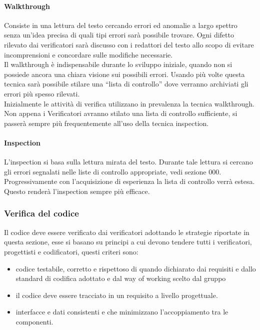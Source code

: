 			\paragraph{Walkthrough}
				Consiste in una lettura del testo cercando errori ed anomalie a largo spettro senza un’idea precisa di quali tipi errori sarà possibile trovare. Ogni difetto rilevato dai verificatori sarà discusso con i redattori del testo allo scopo di evitare incomprensioni e concordare sulle modifiche necessarie.\\
				Il walkthrough è indispensabile durante lo sviluppo iniziale, quando non si possiede ancora una chiara visione sui possibili errori. Usando più volte questa tecnica sarà possibile stilare una “lista di controllo” dove verranno archiviati gli errori più spesso rilevati. \\
				Inizialmente le attività di verifica utilizzano in prevalenza la tecnica walkthrough. Non appena i Verificatori avranno stilato una lista di controllo sufficiente, si passerà sempre più frequentemente all’uso della tecnica inspection.\\
			\paragraph{Inspection}
				L’inspection si basa sulla lettura mirata del testo. Durante tale lettura si cercano gli errori segnalati nelle liste di controllo appropriate, vedi sezione 000. Progressivamente con l’acquisizione di esperienza la lista di controllo verrà estesa. Questo renderà l’inspection sempre più efficace.

		\subsubsection{Verifica del codice}
			Il codice deve essere verificato dai verificatori adottando le strategie riportate in questa sezione, esse si basano su principi a cui devono tendere tutti i verificatori, progettisti e codificatori, questi criteri sono:
			\begin{itemize}
				\item  codice testabile, corretto e rispettoso di quando dichiarato dai requisiti e dallo standard di codifica adottato e dal way of working scelto dal gruppo
				\item il codice deve essere tracciato in un requisito a livello progettuale. 
				\item interfacce e dati consistenti e che minimizzano l’accoppiamento tra le componenti.
			\end{itemize}
